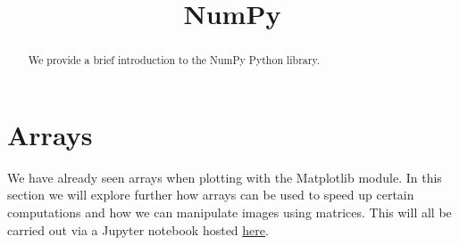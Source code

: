 \documentclass{ximera}
\title{NumPy}
\begin{document}
\begin{abstract}
	We provide a brief introduction to the NumPy Python library.
\end{abstract}
\maketitle

\section{Arrays}

We have already seen arrays when plotting with the Matplotlib module.
In this section we will explore further how arrays can be used to
speed up certain computations and how we can manipulate images using 
matrices. This will all be carried out via a Jupyter notebook hosted
\href{https://colab.research.google.com/drive/1fja8KZpTs5skz6u9AoM1JqIUTxXvG0in?usp=sharing}{here}.
\end{document}
